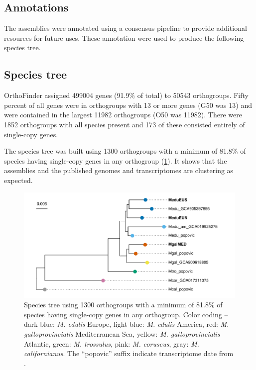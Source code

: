 \documentclass[11pt, a4paper]{article}
\begin{document}
\subsection{Annotations}

The assemblies were annotated using a consensus pipeline to provide additional resources for future uses.
These annotation were used to produce the following species tree.

\subsection{Species tree}

OrthoFinder assigned 499004 genes (91.9\% of total) to 50543 orthogroups. Fifty percent of all 
genes were in orthogroups with 13 or more genes (G50 was 13) and were contained in the largest
11982 orthogroups (O50 was 11982). There were 1852 orthogroups with all species present and 
173 of these consisted entirely of single-copy genes.

The species tree was built using 1300 orthogroups with a minimum of 81.8\% of species having single-copy genes in any orthogroup (\cref{fig:tree}).
It shows that the assemblies and the published genomes and transcriptomes are clustering as expected.

\begin{figure}[h]
	\includegraphics[width=\linewidth]{figures/Fig3_tree.pdf}
	\caption{Species tree using 1300 orthogroups with a minimum of 81.8\% of species having single-copy genes in any orthogroup.
	Color coding -- dark blue: \textit{M. edulis} Europe, light blue: \textit{M. edulis} America,
	red: \textit{M. galloprovincialis} Mediterranean Sea, yellow: \textit{M. galloprovincialis} Atlantic,
	green: \textit{M. trossulus}, pink: \textit{M. coruscus}, gray: \textit{M. californianus}.
	The \enquote{popovic} suffix indicate transcriptome date from \textcite{Popovic2020a}.
	}
	\label{fig:tree}
\end{figure}
\end{document}
